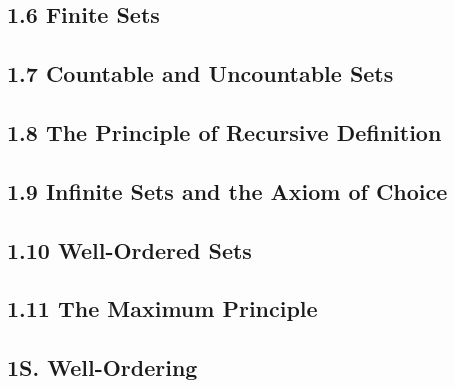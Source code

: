 \documentclass[12pt]{article}
\begin{document}
\subsection*{1.6 Finite Sets}



\subsection*{1.7 Countable and Uncountable Sets}



\subsection*{1.8 The Principle of Recursive Definition}



\subsection*{1.9 Infinite Sets and the Axiom of Choice}

\subsection*{1.10 Well-Ordered Sets}


\subsection*{1.11 The Maximum Principle}


\subsection*{1S. Well-Ordering}











\end{document}
